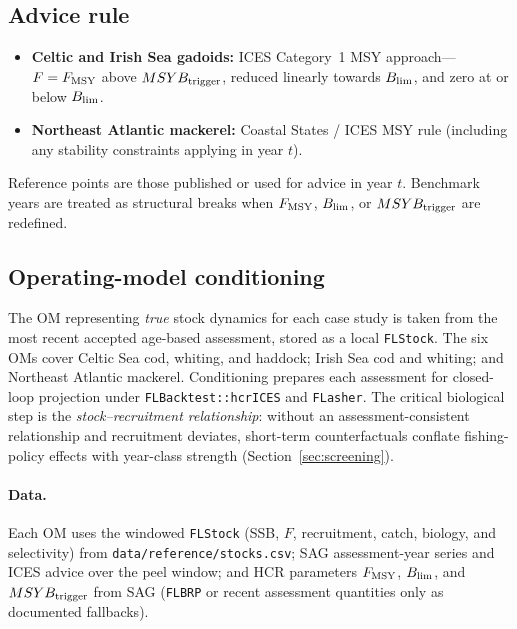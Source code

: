 \documentclass[11pt,a4paper]{extarticle}
\begin{document}
\subsection{Advice rule}

\begin{itemize}
  \item \textbf{Celtic and Irish Sea gadoids:} ICES Category~1 MSY approach---
        \(F = F_{\mathrm{MSY}}\) above \(MSYB_{\mathrm{trigger}}\), reduced linearly towards \(B_{\lim}\),
        and zero at or below \(B_{\lim}\).
  \item \textbf{Northeast Atlantic mackerel:} Coastal States / ICES MSY rule
        (including any stability constraints applying in year \(t\)).
\end{itemize}
Reference points are those published or used for advice in year \(t\).
Benchmark years are treated as structural breaks when \(F_{\mathrm{MSY}}\), \(B_{\lim}\),
or \(MSYB_{\mathrm{trigger}}\) are redefined.

\subsection{Operating-model conditioning}
\label{sec:om-condition}

The OM representing \emph{true} stock dynamics for each case study is taken
from the most recent accepted age-based assessment, stored as a local
\texttt{FLStock}. The six OMs cover Celtic Sea cod, whiting, and haddock;
Irish Sea cod and whiting; and Northeast Atlantic mackerel. Conditioning prepares
each assessment for closed-loop
projection under \texttt{FLBacktest::hcrICES} and \texttt{FLasher}. The
critical biological step is the \emph{stock--recruitment relationship}: without
an assessment-consistent relationship and recruitment deviates, short-term
counterfactuals conflate fishing-policy effects with year-class strength
(Section~\ref{sec:screening}).

\paragraph{Data.}
Each OM uses the windowed \texttt{FLStock} (SSB, \(F\), recruitment, catch,
biology, and selectivity) from \texttt{data/reference/stocks.csv}; SAG
assessment-year series and ICES advice over the peel window; and HCR
parameters \(F_{\mathrm{MSY}}\), \(B_{\lim}\), and \(MSYB_{\mathrm{trigger}}\) from SAG (\texttt{FLBRP} or
recent assessment quantities only as documented fallbacks).
\end{document}
